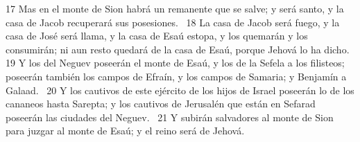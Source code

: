 17 Mas en el monte de Sion habrá un remanente que se salve; y será santo, y la casa de Jacob recuperará sus posesiones.  
18 La casa de Jacob será fuego, y la casa de José será llama, y la casa de Esaú estopa, y los quemarán y los consumirán; ni aun resto quedará de la casa de Esaú, porque Jehová lo ha dicho.  
19 Y los del Neguev poseerán el monte de Esaú, y los de la Sefela a los filisteos; poseerán también los campos de Efraín, y los campos de Samaria; y Benjamín a Galaad.  
20 Y los cautivos de este ejército de los hijos de Israel poseerán lo de los cananeos hasta Sarepta; y los cautivos de Jerusalén que están en Sefarad poseerán las ciudades del Neguev.  
21 Y subirán salvadores al monte de Sion para juzgar al monte de Esaú; y el reino será de Jehová.